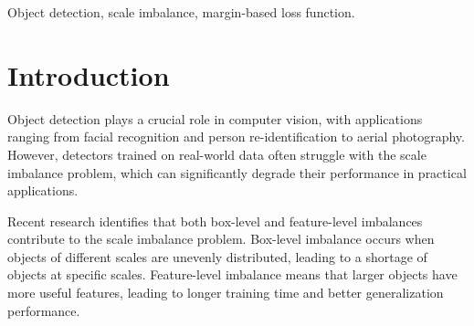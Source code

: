 \documentclass{article}
\begin{document}
\begin{keywords} 
Object detection, scale imbalance, margin-based loss function.
\end{keywords}

\section{Introduction}
\label{section_1}


Object detection plays a crucial role in computer vision, with applications ranging from facial recognition and person re-identification to aerial photography. However, detectors trained on real-world data often struggle with the scale imbalance problem, which can significantly degrade their performance in practical applications. 


Recent research identifies that both box-level and feature-level imbalances~\cite{oksuz2020imbalance} contribute to the scale imbalance problem. 
Box-level imbalance occurs when objects of different scales are unevenly distributed, leading to a shortage of objects at specific scales.
Feature-level imbalance means that larger objects have more useful features, leading to longer training time and better generalization performance.

\end{document}
